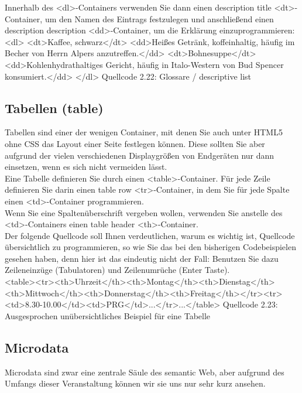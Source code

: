 Innerhalb des <dl>-Containers verwenden Sie dann einen description title <dt>-Container, um den Namen des Eintrags festzulegen und anschließend einen description description <dd>-Container, um die Erklärung einzuprogrammieren:\\

<dl>
<dt>Kaffee, schwarz</dt>
<dd>Heißes Getränk, koffeinhaltig, häufig im Becher von Herrn Alpers anzutreffen.</dd>
<dt>Bohnesuppe</dt>
<dd>Kohlenhydrathaltiges Gericht, häufig in Italo-Western von Bud Spencer konsumiert.</dd>
</dl>
Quellcode 2.22: Glossare / descriptive list

\subsection{Tabellen (table)}

Tabellen sind einer der wenigen Container, mit denen Sie auch unter HTML5 ohne CSS das Layout einer Seite festlegen können. Diese sollten Sie aber aufgrund der vielen verschiedenen Displaygrößen von Endgeräten nur dann einsetzen, wenn es sich nicht vermeiden lässt.\\

Eine Tabelle definieren Sie durch einen <table>-Container. Für jede Zeile definieren Sie darin einen table row <tr>-Container, in dem Sie für jede Spalte einen <td>-Container programmieren.\\

Wenn Sie eine Spaltenüberschrift vergeben wollen, verwenden Sie anstelle des <td>-Containers einen table header <th>-Container.\\

Der folgende Quellcode soll Ihnen verdeutlichen, warum es wichtig ist, Quellcode übersichtlich zu programmieren, so wie Sie das bei den bisherigen Codebeispielen gesehen haben, denn hier ist das eindeutig nicht der Fall: Benutzen Sie dazu Zeileneinzüge (Tabulatoren) und Zeilenumrüche (Enter Taste).\\

<table><tr><th>Uhrzeit</th><th>Montag</th><th>Dienstag</th><th>Mittwoch</th><th>Donnerstag</th><th>Freitag</th></tr><tr><td>8.30-10.00</td><td>PRG</td>...</tr>...</table>
Quellcode 2.23: Ausgesprochen unübersichtliches Beispiel für eine Tabelle

\subsection{Microdata}

Microdata sind zwar eine zentrale Säule des semantic Web, aber aufgrund des Umfangs dieser Veranstaltung können wir sie uns nur sehr kurz ansehen.\\

